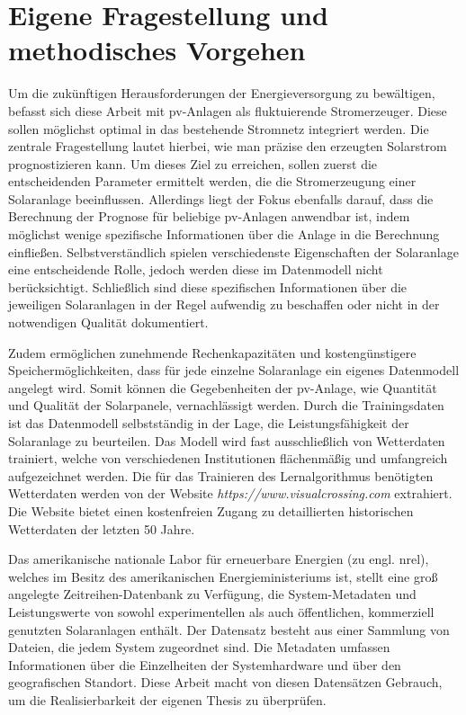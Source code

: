 \documentclass[12pt, a4paper]{article}
\begin{document}
\newpage

\section{Eigene Fragestellung und methodisches Vorgehen}

Um die zukünftigen Herausforderungen der Energieversorgung zu bewältigen, befasst sich diese Arbeit mit \ac{pv}-Anlagen als fluktuierende Stromerzeuger. Diese sollen möglichst optimal in das bestehende Stromnetz integriert werden. Die zentrale Fragestellung lautet hierbei, wie man präzise den erzeugten Solarstrom prognostizieren kann. Um dieses Ziel zu erreichen, sollen zuerst die entscheidenden Parameter ermittelt werden, die die Stromerzeugung einer Solaranlage beeinflussen. Allerdings liegt der Fokus ebenfalls darauf, dass die Berechnung der Prognose für beliebige \ac{pv}-Anlagen anwendbar ist, indem möglichst wenige spezifische Informationen über die Anlage in die Berechnung einfließen. Selbstverständlich spielen verschiedenste Eigenschaften der Solaranlage eine entscheidende Rolle, jedoch werden diese im Datenmodell nicht berücksichtigt. Schließlich sind diese spezifischen Informationen über die jeweiligen Solaranlagen in der Regel aufwendig zu beschaffen oder nicht in der notwendigen Qualität dokumentiert.

Zudem ermöglichen zunehmende Rechenkapazitäten und kostengünstigere Speichermöglichkeiten, dass für jede einzelne Solaranlage ein eigenes Datenmodell angelegt wird. Somit können die Gegebenheiten der \ac{pv}-Anlage, wie Quantität und Qualität der Solarpanele, vernachlässigt werden. Durch die Trainingsdaten ist das Datenmodell selbstständig in der Lage, die Leistungsfähigkeit der Solaranlage zu beurteilen. Das Modell wird fast ausschließlich von Wetterdaten trainiert, welche von verschiedenen Institutionen flächenmäßig und umfangreich aufgezeichnet werden. Die für das Trainieren des Lernalgorithmus benötigten Wetterdaten werden von der Website \textit{https://www.visualcrossing.com} extrahiert. Die Website bietet einen kostenfreien Zugang zu detaillierten historischen Wetterdaten der letzten 50 Jahre.

Das amerikanische nationale Labor für erneuerbare Energien (zu engl. \ac{nrel}), welches im Besitz des amerikanischen Energieministeriums ist, stellt eine groß angelegte Zeitreihen-Datenbank zu Verfügung, die System-Metadaten und Leistungswerte von sowohl experimentellen als auch öffentlichen, kommerziell genutzten Solaranlagen enthält.  Der Datensatz besteht aus einer Sammlung von Dateien, die jedem System zugeordnet sind. Die Metadaten umfassen Informationen über die Einzelheiten der Systemhardware und über den geografischen Standort. Diese Arbeit macht von diesen Datensätzen Gebrauch, um die Realisierbarkeit der eigenen Thesis zu überprüfen. 
\end{document}
